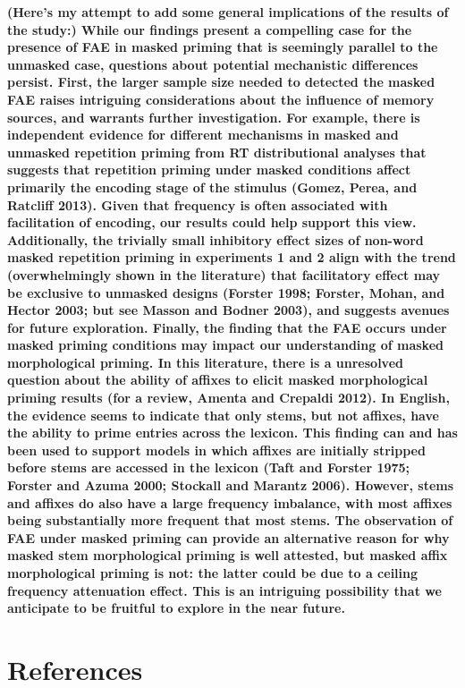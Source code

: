 \documentclass[
]{interact}
\begin{document}
\textbf{(Here's my attempt to add some general implications of the
results of the study:) While our findings present a compelling case for
the presence of FAE in masked priming that is seemingly parallel to the
unmasked case, questions about potential mechanistic differences
persist. First, the larger sample size needed to detected the masked FAE
raises intriguing considerations about the influence of memory sources,
and warrants further investigation. For example, there is independent
evidence for different mechanisms in masked and unmasked repetition
priming from RT distributional analyses that suggests that repetition
priming under masked conditions affect primarily the encoding stage of
the stimulus (Gomez, Perea, and Ratcliff 2013). Given that frequency is
often associated with facilitation of encoding, our results could help
support this view. Additionally, the trivially small inhibitory effect
sizes of non-word masked repetition priming in experiments 1 and 2 align
with the trend (overwhelmingly shown in the literature) that
facilitatory effect may be exclusive to unmasked designs (Forster 1998;
Forster, Mohan, and Hector 2003; but see Masson and Bodner 2003), and
suggests avenues for future exploration. Finally, the finding that the
FAE occurs under masked priming conditions may impact our understanding
of masked morphological priming. In this literature, there is a
unresolved question about the ability of affixes to elicit masked
morphological priming results (for a review, Amenta and Crepaldi 2012).
In English, the evidence seems to indicate that only stems, but not
affixes, have the ability to prime entries across the lexicon. This
finding can and has been used to support models in which affixes are
initially stripped before stems are accessed in the lexicon (Taft and
Forster 1975; Forster and Azuma 2000; Stockall and Marantz 2006).
However, stems and affixes do also have a large frequency imbalance,
with most affixes being substantially more frequent that most stems. The
observation of FAE under masked priming can provide an alternative
reason for why masked stem morphological priming is well attested, but
masked affix morphological priming is not: the latter could be due to a
ceiling frequency attenuation effect. This is an intriguing possibility
that we anticipate to be fruitful to explore in the near future.}

\newpage{}

\section*{References}\label{references}
\end{document}

